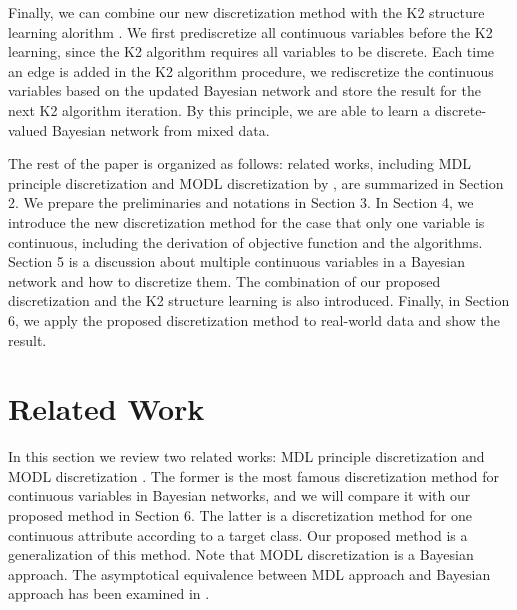 Finally, we can combine our new discretization method with the K2 structure learning alorithm \citep{K2}. We first prediscretize all continuous variables before the K2 learning, since the K2 algorithm requires all variables to be discrete. Each time an edge is added in the K2 algorithm procedure, we rediscretize the continuous variables based on the updated Bayesian network and store the result for the next K2 algorithm iteration. By this principle, we are able to learn a discrete-valued Bayesian network from mixed data.

The rest of the paper is organized as follows: related works, including MDL principle discretization \citep{Friedman_1996} and MODL discretization by \citet{Boulle_2006}, are summarized in Section 2. We prepare the preliminaries and notations in Section 3. In Section 4, we introduce the new discretization method for the case that only one variable is continuous, including the derivation of objective function and the algorithms. Section 5 is a discussion about multiple continuous variables in a Bayesian network and how to discretize them. The combination of our proposed discretization and the K2 structure learning is also introduced. Finally, in Section 6, we apply the proposed discretization method to real-world data and show the result.

\section{Related Work}
\label{relat_work}
In this section we review two related works: MDL principle discretization \citep{Friedman_1996} and MODL discretization \citep{Boulle_2006}. The former is the most famous discretization method for continuous variables in Bayesian networks, and we will compare it with our proposed method in Section 6. The latter is a discretization method for one continuous attribute according to a target class. Our proposed method is a generalization of this method. Note that MODL discretization is a Bayesian approach. The asymptotical equivalence between MDL approach and Bayesian approach has been examined in \citep{VL_2000}.
